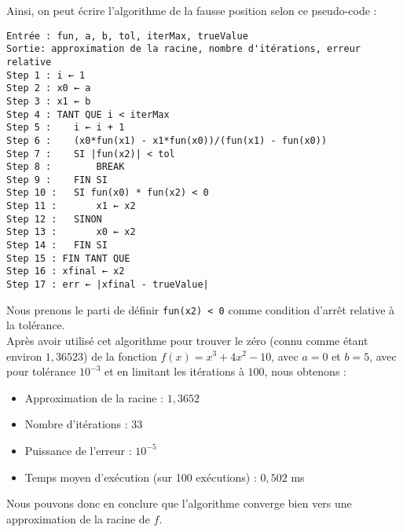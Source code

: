 \documentclass[12pt]{article}
\begin{document}
\noindent Ainsi, on peut écrire l'algorithme de la fausse position selon ce pseudo-code :
\begin{verbatim}
Entrée : fun, a, b, tol, iterMax, trueValue
Sortie: approximation de la racine, nombre d'itérations, erreur relative
Step 1 : i ← 1
Step 2 : x0 ← a
Step 3 : x1 ← b
Step 4 : TANT QUE i < iterMax
Step 5 :    i ← i + 1
Step 6 :    (x0*fun(x1) - x1*fun(x0))/(fun(x1) - fun(x0))
Step 7 :    SI |fun(x2)| < tol
Step 8 :        BREAK
Step 9 :    FIN SI
Step 10 :   SI fun(x0) * fun(x2) < 0
Step 11 :       x1 ← x2
Step 12 :   SINON
Step 13 :       x0 ← x2
Step 14 :   FIN SI
Step 15 : FIN TANT QUE
Step 16 : xfinal ← x2
Step 17 : err ← |xfinal - trueValue|
\end{verbatim}
\noindent Nous prenons le parti de définir \texttt{fun(x2) < 0} comme condition d'arrêt relative à la tolérance.\\
\noindent Après avoir utilisé cet algorithme pour trouver le zéro (connu comme étant environ $1,36523$) de la fonction $f(x) = x^3 + 4x^2 -10$, avec $a=0$ et $b=5$, avec pour tolérance $10^{-3}$ et en limitant les itérations à $100$, nous obtenons :
\begin{itemize}
    \item Approximation de la racine : $1,3652$
    \item Nombre d'itérations : $33$
    \item Puissance de l'erreur : $10^{-5}$
    \item Temps moyen d'exécution (sur 100 exécutions) : $0,502$ ms
\end{itemize}
Nous pouvons donc en conclure que l'algorithme converge bien vers une approximation de la racine de $f$.



\end{document}
